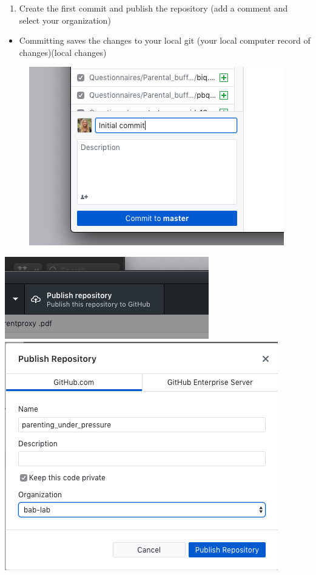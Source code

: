 \documentclass[]{book}
\providecommand{\tightlist}{%
  \setlength{\itemsep}{0pt}\setlength{\parskip}{0pt}}
\begin{document}
\begin{enumerate}
\def\labelenumi{\arabic{enumi}.}
\setcounter{enumi}{6}
\tightlist
\item
  Create the first commit and publish the repository (add a comment and
  select your organization)
\end{enumerate}

\begin{itemize}
\tightlist
\item
  Committing saves the changes to your local git (your local computer
  record of changes)(local changes)
\end{itemize}

\begin{figure}
\centering
\includegraphics{images/research_protocols/github/11.png}
\caption{}
\end{figure}

\includegraphics{images/research_protocols/github/7.png}
\includegraphics{images/research_protocols/github/8.png}
\end{document}
